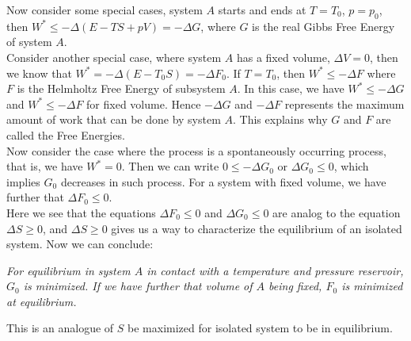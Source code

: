 \documentclass[11pt,oneside]{book}
\theoremstyle{break}
\theoremstyle{break}
\begin{document}
Now consider some special cases, system $A$ starts and ends at $T=  T_0$, $p=p_0$, then $W^* \leq -\Delta (E - TS + pV) = -\Delta G$, where $G$ is the real Gibbs Free Energy of system $A$.\\

Consider another special case, where system $A$ has a fixed volume, $\Delta V = 0$, then we know that $W^* = -\Delta (E - T_0 S) = -\Delta F_0$. If $T = T_0$, then $W^* \leq -\Delta F$ where $F$ is the Helmholtz Free Energy of subsystem $A$. In this case, we have $W^* \leq -\Delta G$ and $W^* \leq -\Delta F$ for fixed volume. Hence $-\Delta G$ and $-\Delta F$ represents the maximum amount of work that can be done by system $A$. This explains why $G$ and $F$ are called the Free Energies. \\

Now consider the case where the process is a spontaneously occurring process, that is, we have $W^* = 0$. Then we can write $0 \leq -\Delta G_0$ or $\Delta G_0 \leq 0$, which implies $G_0$ decreases in such process. For a system with fixed volume, we have further that $\Delta F_0 \leq 0$. \\

Here we see that the equations $\Delta F_0 \leq 0$ and $\Delta G_0 \leq 0$ are analog to the equation $\Delta S \geq 0$, and $\Delta S \geq 0$ gives us a way to characterize the equilibrium of an isolated system. Now we can conclude: 
\begin{center}
\textit{For equilibrium in system $A$ in contact with a temperature and pressure reservoir, $G_0$ is minimized. If we have further that volume of $A$ being fixed, $F_0$ is minimized at equilibrium.}
\end{center}
This is an analogue of $S$ be maximized for isolated system to be in equilibrium. \\
\end{document}
